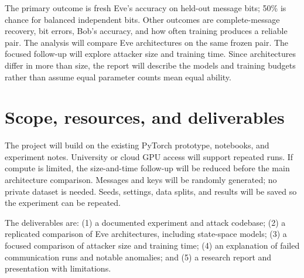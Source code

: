 \documentclass[10pt,letterpaper]{article}
\begin{document}
The primary outcome is fresh Eve's accuracy on held-out message bits; 50\% is chance for balanced independent bits. Other outcomes are complete-message recovery, bit errors, Bob's accuracy, and how often training produces a reliable pair. The analysis will compare Eve architectures on the same frozen pair. The focused follow-up will explore attacker size and training time. Since architectures differ in more than size, the report will describe the models and training budgets rather than assume equal parameter counts mean equal ability.

\section{Scope, resources, and deliverables}
The project will build on the existing PyTorch prototype, notebooks, and experiment notes. University or cloud GPU access will support repeated runs. If compute is limited, the size-and-time follow-up will be reduced before the main architecture comparison. Messages and keys will be randomly generated; no private dataset is needed. Seeds, settings, data splits, and results will be saved so the experiment can be repeated.

The deliverables are: (1) a documented experiment and attack codebase; (2) a replicated comparison of Eve architectures, including state-space models; (3) a focused comparison of attacker size and training time; (4) an explanation of failed communication runs and notable anomalies; and (5) a research report and presentation with limitations.
\end{document}
